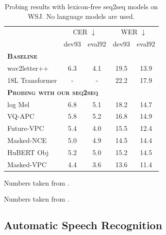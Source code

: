 \documentclass[11pt,a4paper]{article}
\begin{document}
%
%
%
%


%
%
%
%
%
%
%
%
%
%
%
%
%
%
%
%
%
%
%
%
%
%
%
%
%
%
%
%
%
%

\begin{table}[t]
  \caption{Probing results with lexicon-free seq2seq models on WSJ.
    No language models are used.}
  \label{tab:downstream_asr}
  \centering
  \begin{threeparttable}
  \footnotesize
  \addtolength{\tabcolsep}{-0.11em}
  \begin{tabularx}{0.94\linewidth}{lcccc}
    \toprule
      &\multicolumn{2}{c}{CER $\downarrow$} &\multicolumn{2}{c}{WER $\downarrow$}\\
            &dev93 &eval92  &dev93 &eval92\\[1pt]
    \midrule
    \multicolumn{4}{l}{\textbf{\textsc{Baseline}}}  \\[2pt]
    wav2letter++ \tnote{\dag}   &6.3   &4.1    &19.5     &13.9\\
    18L Transformer\tnote{\ddag}&- &- &22.2     &17.9\\
    \midrule                                                                                                                 
    \multicolumn{4}{l}{\textbf{\textsc{Probing with our seq2seq}}}  \\[2pt]
    log Mel     &6.8   &5.1  &18.2      &14.7 \\
    VQ-APC      &5.8  &5.2    &16.8      &14.9  \\
    Future-VPC   &5.4  &4.0    &15.5      &12.4  \\
    Masked-NCE   &5.0  &4.9    &14.5      &14.4  \\
    HuBERT Obj     &5.2  &5.0    &15.2      &14.5  \\
    Masked-VPC   &4.4  &3.6    &13.6      &11.4  \\
    \bottomrule
  \end{tabularx}
  \begin{tablenotes}\footnotesize
  \item[\dag] Numbers taken from \citet{baevski2019vq}.
  \item[\ddag] Numbers taken from \citet{higuchi2020mask}. 
  \end{tablenotes}
  \end{threeparttable}
\end{table}

\subsection{Automatic Speech Recognition}
\end{document}
